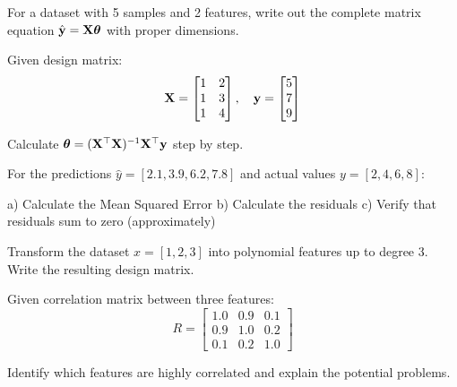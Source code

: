 \documentclass{article}
\newcounter{exercise}
\begin{document}
\begin{tcolorbox}[colback=gray!5!white,colframe=gray!75!black,title=Problem \stepcounter{exercise}: Matrix Setup]

For a dataset with 5 samples and 2 features, write out the complete matrix equation $\hat{\mathbf{y}} = \mathbf{X}\boldsymbol{\theta}$ with proper dimensions.
\end{tcolorbox}

\begin{tcolorbox}[colback=gray!5!white,colframe=gray!75!black,title=Problem \stepcounter{exercise}: Normal Equation Calculation]

Given design matrix:
$$\mathbf{X} = \begin{bmatrix} 1 & 2 \\ 1 & 3 \\ 1 & 4 \end{bmatrix}, \quad \mathbf{y} = \begin{bmatrix} 5 \\ 7 \\ 9 \end{bmatrix}$$

Calculate $\boldsymbol{\theta} = (\mathbf{X}^\top \mathbf{X})^{-1} \mathbf{X}^\top \mathbf{y}$ step by step.
\end{tcolorbox}

\begin{tcolorbox}[colback=gray!5!white,colframe=gray!75!black,title=Problem \stepcounter{exercise}: MSE Calculation]

For the predictions $\hat{y} = [2.1, 3.9, 6.2, 7.8]$ and actual values $y = [2, 4, 6, 8]$:

a) Calculate the Mean Squared Error
b) Calculate the residuals
c) Verify that residuals sum to zero (approximately)
\end{tcolorbox}

\begin{tcolorbox}[colback=gray!5!white,colframe=gray!75!black,title=Problem \stepcounter{exercise}: Polynomial Regression]

Transform the dataset $x = [1, 2, 3]$ into polynomial features up to degree 3. Write the resulting design matrix.
\end{tcolorbox}

\begin{tcolorbox}[colback=gray!5!white,colframe=gray!75!black,title=Problem \stepcounter{exercise}: Multicollinearity Detection]

Given correlation matrix between three features:
$$R = \begin{bmatrix} 1.0 & 0.9 & 0.1 \\ 0.9 & 1.0 & 0.2 \\ 0.1 & 0.2 & 1.0 \end{bmatrix}$$

Identify which features are highly correlated and explain the potential problems.
\end{tcolorbox}
\end{document}
